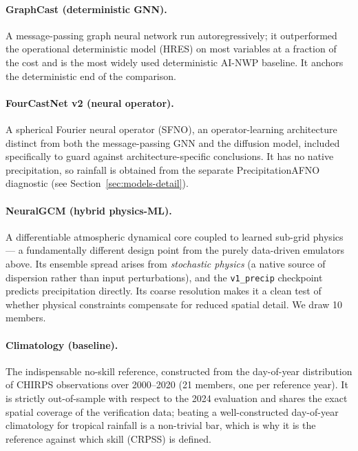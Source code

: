 \documentclass[11pt]{article}
\newcommand{\code}[1]{\texttt{\small #1}}
\begin{document}
\paragraph{GraphCast (deterministic GNN).} A message-passing graph neural
network run autoregressively; it outperformed the operational deterministic
model (HRES) on most variables at a fraction of the cost and is the most widely
used deterministic AI-NWP baseline. It anchors the deterministic end of the
comparison.

\paragraph{FourCastNet v2 (neural operator).} A spherical Fourier neural
operator (SFNO), an operator-learning architecture distinct from both the
message-passing GNN and the diffusion model, included specifically to guard
against architecture-specific conclusions. It has no native precipitation, so
rainfall is obtained from the separate PrecipitationAFNO diagnostic (see
Section~\ref{sec:models-detail}).

\paragraph{NeuralGCM (hybrid physics-ML).} A differentiable atmospheric
dynamical core coupled to learned sub-grid physics --- a fundamentally different
design point from the purely data-driven emulators above. Its ensemble spread
arises from \emph{stochastic physics} (a native source of dispersion rather than
input perturbations), and the \code{v1\_precip} checkpoint predicts
precipitation directly. Its coarse resolution makes it a clean test of whether
physical constraints compensate for reduced spatial detail. We draw 10 members.

\paragraph{Climatology (baseline).} The indispensable no-skill reference,
constructed from the day-of-year distribution of CHIRPS observations over
2000--2020 (21 members, one per reference year). It is strictly out-of-sample
with respect to the 2024 evaluation and shares the exact spatial coverage of the
verification data; beating a well-constructed day-of-year climatology for
tropical rainfall is a non-trivial bar, which is why it is the reference against
which skill (CRPSS) is defined.

\end{document}

